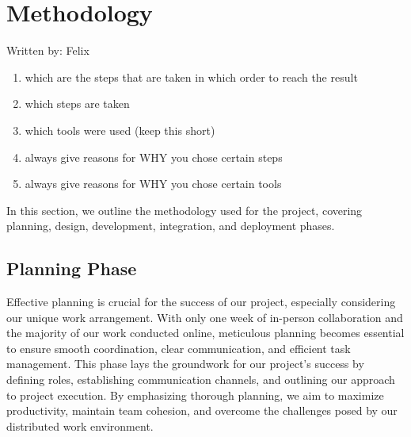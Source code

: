 \section{Methodology}
{\tiny Written by: Felix}\\

\begin{enumerate}
    \item which are the steps that are taken 
    in which order to reach the result
    \item which steps are taken
    \item which tools were used (keep this short)
    \item always give reasons for WHY you chose 
    certain steps
    \item always give reasons for WHY you 
    chose certain tools
\end{enumerate}

In this section, we outline the methodology used for the project, covering planning, design, development, integration, and deployment phases.

\subsection{Planning Phase}

Effective planning is crucial for the success of our project, especially considering our unique work arrangement. With only one week of in-person collaboration and the majority of our work conducted online, meticulous planning becomes essential to ensure smooth coordination, clear communication, and efficient task management. This phase lays the groundwork for our project's success by defining roles, establishing communication channels, and outlining our approach to project execution. By emphasizing thorough planning, we aim to maximize productivity, maintain team cohesion, and overcome the challenges posed by our distributed work environment.

